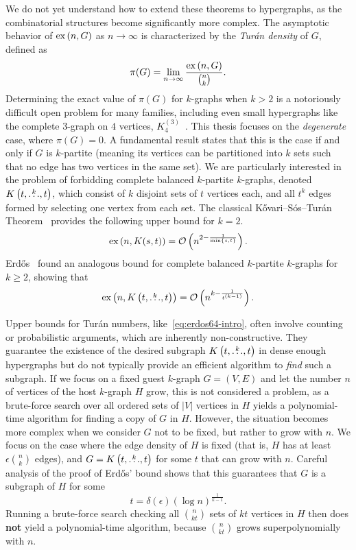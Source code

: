 We do not yet understand how to extend these theorems to hypergraphs,
as the combinatorial structures become significantly more complex.
The asymptotic behavior of $\text{ex} \left( n, G \right)$ as $n \to \infty$
is characterized by the \emph{Turán density} of $G$, defined as
\[
    \pi(G) = \lim_{n \to \infty} \frac{\text{ex} \left( n, G \right)}{\binom{n}{k}}.
\]
Determining the exact value of $\pi(G)$ for $k$-graphs when $k > 2$
is a notoriously difficult open problem for many families,
including even small hypergraphs like the complete $3$-graph on $4$ vertices,
$K_4^{(3)}$~\cite{keevash2011hypergraph, razborov20103}.
This thesis focuses on the \emph{degenerate} case, where $\pi(G) = 0$.
A fundamental result states that this is the case if and only if $G$ is $k$-partite
(meaning its vertices can be partitioned into $k$ sets such that no edge has two vertices in the same set).
We are particularly interested in the problem of forbidding complete balanced $k$-partite $k$-graphs,
denoted $K\left(t, \overset{k}{\dots}, t\right)$, which consist of $k$ disjoint sets of $t$ vertices each,
and all $t^k$ edges formed by selecting one vertex from each set.
The classical Kővari--Sós--Turán Theorem~\cite{Kovari1954, Hylten1958}
provides the following upper bound for $k=2$.
\[
    \text{ex} \left( n, K(s, t) \right) = \mathcal{O}\left(n^{2 - \frac{1}{\min\{s, t\}}}\right).
\]
Erdős~\cite{Erdos1964} found an analogous bound for complete balanced $k$-partite $k$-graphs for $k \ge 2$,
showing that
\begin{equation} \label{eq:erdos64-intro}
    \text{ex} \left( n, K\left(t, \overset{k}{\dots}, t\right) \right) = \mathcal{O}\left(n^{k - \frac{1}{t^{(k-1)}}}\right).
\end{equation}

Upper bounds for Turán numbers, like~\eqref{eq:erdos64-intro},
often involve counting or probabilistic arguments,
which are inherently non-constructive.
They guarantee the existence of the desired subgraph $K\left(t, \overset{k}{\dots}, t\right)$
in dense enough hypergraphs but do not typically provide an efficient algorithm to \emph{find} such a subgraph.
If we focus on a fixed guest $k$-graph $G = (V, E)$ and let the number $n$ of vertices of the host $k$-graph $H$ grow,
this is not considered a problem,
as a brute-force search over all ordered sets of $|V|$ vertices in $H$ yields a polynomial-time algorithm
for finding a copy of $G$ in $H$.
However, the situation becomes more complex when we consider $G$ not to be fixed, but rather to grow with $n$.
We focus on the case where the edge density of $H$ is fixed (that is, $H$ has at least $\epsilon \binom{n}{k}$ edges),
and $G = K\left(t, \overset{k}{\dots}, t\right)$ for some $t$ that can grow with $n$.
Careful analysis of the proof of Erdős' bound shows that this guarantees that $G$ is a subgraph of $H$ for some
\begin{equation} \label{eq:t-lower-intro}
    t = \delta(\epsilon) (\log n)^{\frac{1}{k-1}}.
\end{equation}
Running a brute-force search checking all $\binom{n}{kt}$ sets of $kt$
vertices in $H$ then does \textbf{not} yield a polynomial-time algorithm,
because $\binom{n}{kt}$ grows superpolynomially with $n$.

